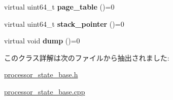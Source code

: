 \begin{DoxyCompactItemize}
\item 
\hypertarget{classprocessor__state__base_a436b776e0fe773cc856a71a669514ff9}{}virtual uint64\+\_\+t {\bfseries page\+\_\+table} ()=0\label{classprocessor__state__base_a436b776e0fe773cc856a71a669514ff9}

\item 
\hypertarget{classprocessor__state__base_ab617887e3d076158d3e54b7ff0f3a586}{}virtual uint64\+\_\+t {\bfseries stack\+\_\+pointer} ()=0\label{classprocessor__state__base_ab617887e3d076158d3e54b7ff0f3a586}

\item 
\hypertarget{classprocessor__state__base_af083c79264a522f72719a43987ed321d}{}virtual void {\bfseries dump} ()=0\label{classprocessor__state__base_af083c79264a522f72719a43987ed321d}

\end{DoxyCompactItemize}


このクラス詳解は次のファイルから抽出されました\+:\begin{DoxyCompactItemize}
\item 
\hyperlink{processor__state__base_8h}{processor\+\_\+state\+\_\+base.\+h}\item 
\hyperlink{processor__state__base_8cpp}{processor\+\_\+state\+\_\+base.\+cpp}\end{DoxyCompactItemize}

